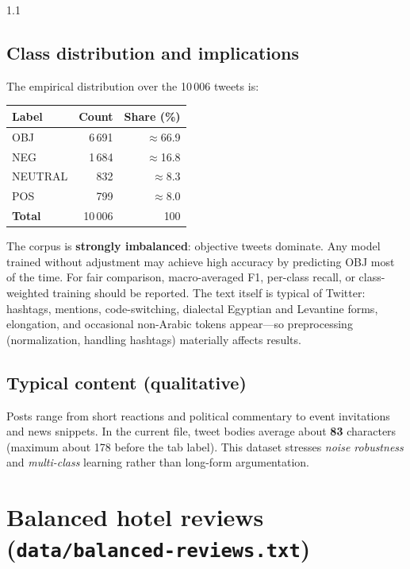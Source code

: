 \documentclass[11pt,a4paper]{report}
\begin{document}
\begin{spacing}{1.1}
\subsection{Class distribution and implications}
The empirical distribution over the 10\,006 tweets is:
\begin{center}
\begin{tabular}{@{}lrr@{}}
    \toprule
    \textbf{Label} & \textbf{Count} & \textbf{Share (\%)} \\
    \midrule
    OBJ     & 6\,691 & $\approx$66.9 \\
    NEG     & 1\,684 & $\approx$16.8 \\
    NEUTRAL &   832 & $\approx$8.3 \\
    POS     &   799 & $\approx$8.0 \\
    \midrule
    \textbf{Total} & 10\,006 & 100 \\
    \bottomrule
\end{tabular}
\end{center}
The corpus is \textbf{strongly imbalanced}: objective tweets dominate. Any model trained without adjustment may achieve high accuracy by predicting OBJ most of the time. For fair comparison, macro-averaged F1, per-class recall, or class-weighted training should be reported. The text itself is typical of Twitter: hashtags, mentions, code-switching, dialectal Egyptian and Levantine forms, elongation, and occasional non-Arabic tokens appear---so preprocessing (normalization, handling hashtags) materially affects results.

\subsection{Typical content (qualitative)}
Posts range from short reactions and political commentary to event invitations and news snippets. In the current file, tweet bodies average about \textbf{83} characters (maximum about 178 before the tab label). This dataset stresses \emph{noise robustness} and \emph{multi-class} learning rather than long-form argumentation.

\section{Balanced hotel reviews (\texttt{data/balanced-reviews.txt})}


\end{spacing}
\end{document}
